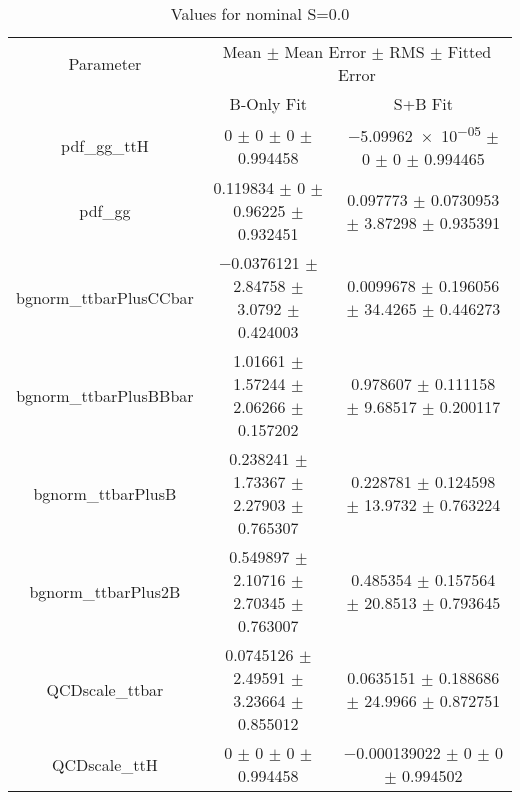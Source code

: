 \begin{table}
\centering
\caption{Values for nominal S=0.0}
\begin{tabular}{ccc}
\toprule
Parameter & \multicolumn{2}{c}{Mean $\pm$ Mean Error $\pm$ RMS $\pm$ Fitted Error}\\
 & B-Only Fit & S+B Fit\\
\midrule
pdf\_gg\_ttH & \num{0} $\pm$ \num{0} $\pm$ \num{0} $\pm$ \num{0.994458} & \num{-5.09962e-05} $\pm$ \num{0} $\pm$ \num{0} $\pm$ \num{0.994465}\\
pdf\_gg & \num{0.119834} $\pm$ \num{0} $\pm$ \num{0.96225} $\pm$ \num{0.932451} & \num{0.097773} $\pm$ \num{0.0730953} $\pm$ \num{3.87298} $\pm$ \num{0.935391}\\
bgnorm\_ttbarPlusCCbar & \num{-0.0376121} $\pm$ \num{2.84758} $\pm$ \num{3.0792} $\pm$ \num{0.424003} & \num{0.0099678} $\pm$ \num{0.196056} $\pm$ \num{34.4265} $\pm$ \num{0.446273}\\
bgnorm\_ttbarPlusBBbar & \num{1.01661} $\pm$ \num{1.57244} $\pm$ \num{2.06266} $\pm$ \num{0.157202} & \num{0.978607} $\pm$ \num{0.111158} $\pm$ \num{9.68517} $\pm$ \num{0.200117}\\
bgnorm\_ttbarPlusB & \num{0.238241} $\pm$ \num{1.73367} $\pm$ \num{2.27903} $\pm$ \num{0.765307} & \num{0.228781} $\pm$ \num{0.124598} $\pm$ \num{13.9732} $\pm$ \num{0.763224}\\
bgnorm\_ttbarPlus2B & \num{0.549897} $\pm$ \num{2.10716} $\pm$ \num{2.70345} $\pm$ \num{0.763007} & \num{0.485354} $\pm$ \num{0.157564} $\pm$ \num{20.8513} $\pm$ \num{0.793645}\\
QCDscale\_ttbar & \num{0.0745126} $\pm$ \num{2.49591} $\pm$ \num{3.23664} $\pm$ \num{0.855012} & \num{0.0635151} $\pm$ \num{0.188686} $\pm$ \num{24.9966} $\pm$ \num{0.872751}\\
QCDscale\_ttH & \num{0} $\pm$ \num{0} $\pm$ \num{0} $\pm$ \num{0.994458} & \num{-0.000139022} $\pm$ \num{0} $\pm$ \num{0} $\pm$ \num{0.994502}\\
\bottomrule
\end{tabular}
\end{table}